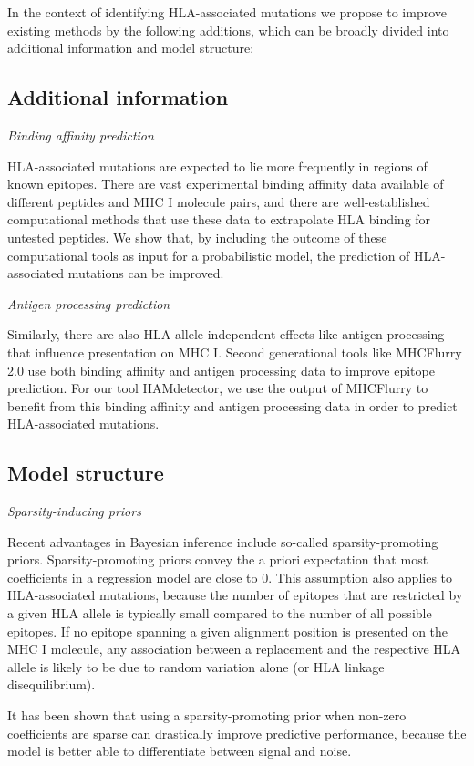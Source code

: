 \documentclass[fleqn,11pt]{SelfArx} %
\begin{document}
In the context of identifying HLA-associated mutations we propose to improve existing methods by the following additions, which can be broadly divided into  additional information and model structure:
\subsection*{Additional information}

  \textit{Binding affinity prediction}

    HLA-associated mutations are expected to lie more frequently in regions of known epitopes. There are vast experimental binding affinity data available of different peptides and MHC I molecule pairs, and there are well-established computational methods that use these data to extrapolate HLA binding for untested peptides. We show that, by including the outcome of these computational tools as input for a probabilistic model, the prediction of HLA-associated mutations can be improved.

  \textit{Antigen processing prediction}
  
    Similarly, there are also HLA-allele independent effects like antigen processing that influence presentation on MHC I. Second generational tools like MHCFlurry 2.0 use both binding affinity and antigen processing data to improve epitope prediction. For our tool HAMdetector, we use the output of MHCFlurry to benefit from this binding affinity and antigen processing data in order to predict HLA-associated mutations.

\subsection*{Model structure}

  \textit{Sparsity-inducing priors}
  
  Recent advantages in Bayesian inference include so-called sparsity-promoting priors. Sparsity-promoting priors convey the a priori expectation that most coefficients in a regression model are close to 0. This assumption also applies to HLA-associated mutations, because the number of epitopes that are restricted by a given HLA allele is typically small compared to the number of all possible epitopes. If no epitope spanning a given alignment position is presented on the MHC I molecule, any association between a replacement and the respective HLA allele  is likely to be due to random variation alone (or HLA linkage disequilibrium).
  
  It has been shown that using a sparsity-promoting prior when non-zero coefficients are sparse can drastically improve predictive performance, because the model is better able to differentiate between signal and noise.
\end{document}
